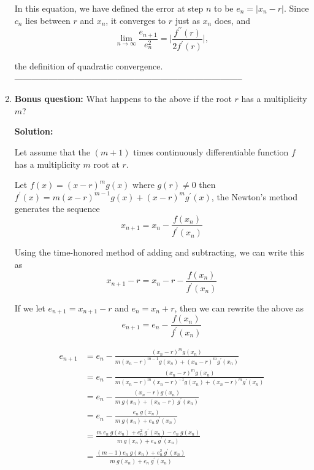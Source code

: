 \documentclass[a4paper,11pt]{report}
\begin{document}
\begin{enumerate}
    In this equation, we have defined  the error at step $n$ to be $e_{n} = |x_{n} - r|$. Since $c_{n}$ lies between $r$ and $x_{n}$, it converges to $r$ just as $x_{n}$ does, and
    \begin{equation*}
    \lim_{n \rightarrow \infty} \frac{e_{n+1}}{e_{n}^2} = \Bigg| \frac{f^{\prime\prime}(r)}{2f^{\prime}(r)} \Bigg|,
    \end{equation*}
    
    the definition of quadratic convergence.    
--------------------------------------------------------------------------------
     





    \item \textbf{Bonus question:} What happens to the above if the root $r$ has
     a multiplicity $m$?
    
    \textbf{Solution:}

    Let assume that the $(m+1)$ times continuously differentiable function $f$ has a multiplicity $m$ root at $r$. 

    Let $f(x) = (x-r)^{m} g(x)$ where $g(r) \neq 0$ then $f^{\prime}(x) = m(x-r)^{m-1} g(x) + (x-r)^{m} g^{\prime}(x)$, the Newton's method generates the sequence
    \begin{equation*}
    x_{n+1} = x_{n} - \frac{f(x_{n})}{f^{\prime}(x_{n})} 
    \end{equation*}

    Using the time-honored method of adding and subtracting, we can write this as
    \begin{equation*}
    x_{n+1} - r = x_{n} - r - \frac{f(x_{n})}{f^{\prime}(x_{n})}
    \end{equation*}
    
    If we let $e_{n+1} = x_{n+1} - r$ and $e_{n} = x_{n} + r$, then we can rewrite the above as
    \begin{equation*}
    e_{n+1} = e_{n} - \frac{f(x_{n})}{f^{\prime}(x_{n})}
    \end{equation*}

    \begin{equation*}
    \begin{aligned}
    e_{n+1} &= e_{n} - \frac{(x_{n} - r)^{m} g(x_{n})}{m(x_{n} - r)^{m-1} g(x_{n}) + (x_{n} - r)^{m} g^{\prime}(x_{n})} \\
            &= e_{n} - \frac{(x_{n} - r)^{m} g(x_{n})}{m(x_{n} - r)^{m} (x_{n} - r)^{-1} g(x_{n}) + (x_{n} - r)^{m} g^{\prime}(x_{n})} \\
            &= e_{n} - \frac{(x_{n} - r) g(x_{n})}{m\ g(x_{n}) + (x_{n} - r)\ g^{\prime}(x_{n})} \\
            &= e_{n} - \frac{e_{n}\ g(x_{n})}{m\ g(x_{n}) + e_{n}\ g^{\prime}(x_{n})} \\
            &= \frac{m\ e_{n}\ g(x_{n}) + e_{n}^{2}\ g^{\prime}(x_{n}) - e_{n}\ g(x_{n})}{m\ g(x_{n}) + e_{n}\ g^{\prime}(x_{n})} \\
            &= \frac{(m - 1)e_{n}\ g(x_{n}) + e_{n}^{2}\ g^{\prime}(x_{n})}{m\ g(x_{n}) + e_{n}\ g^{\prime}(x_{n})}
    \end{aligned}
    \end{equation*}
    

\end{enumerate}
\end{document}
